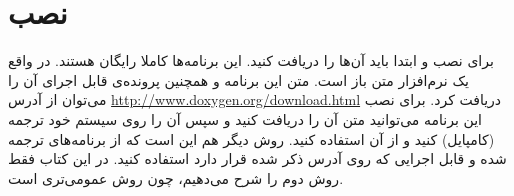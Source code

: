 
%
% 
% 
% 
%
\chapter{نصب}
 
برای نصب  و  ابتدا باید آن‌ها را دریافت کنید. این
برنامه‌ها کاملا رایگان هستند.
در واقع  یک نرم‌افزار متن باز است. متن
این برنامه و همچنین پرونده‌ی قابل اجرای آن را می‌توان از آدرس
\url{http://www.doxygen.org/download.html} 
دریافت کرد. برای نصب این برنامه می‌توانید متن آن را دریافت کنید و سپس آن را
روی سیستم خود ترجمه (کامپایل) کنید و از آن استفاده کنید. روش دیگر هم این است
که از برنامه‌های ترجمه شده و قابل اجرایی که روی آدرس ذکر شده قرار دارد
استفاده کنید. در این کتاب فقط روش دوم را شرح می‌دهیم، چون روش عمومی‌تری است.




